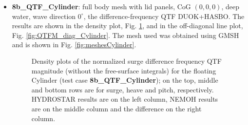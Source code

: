 \documentclass[12pt,a4paper,titlepage]{article}
\begin{document}
\begin{itemize}
\item \textbf{8b\_QTF\_Cylinder}: full body mesh with lid panels, CoG $(0,0,0)$, deep water, wave direction $0^{\circ}$, the difference-frequency QTF DUOK+HASBO. The results are shown in the density plot, Fig. \ref{fig:QTFM_Cylinder}, and in the off-diagonal line plot, Fig. \ref{fig:QTFM_diag_Cylinder}. The mesh used was obtained using GMSH \cite{gmsh} and is shown in Fig. \ref{fig:meshesCylinder}.

\begin{figure}[h!tbp]
	\centering
{}
	\caption{Density plots of the normalized surge difference frequency QTF magnitude (without the free-surface integrals) for the floating Cylinder (test case \textbf{8b\_QTF\_Cylinder}); on the top, middle and bottom rows are for surge, heave and pitch, respectively. HYDROSTAR results are on the left column, NEMOH results are on the middle column and the difference on the right column.}\label{fig:QTFM_Cylinder}
\end{figure}


\end{itemize}
\end{document}
